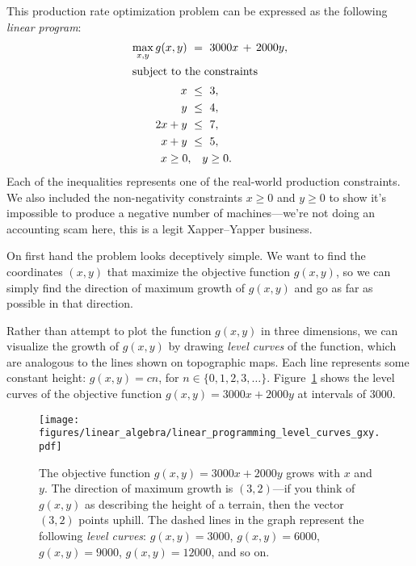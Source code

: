 \documentclass[11pt,oneside]{article}
\begin{document}
	This production rate optimization problem can be expressed as the following \emph{linear program}:
	\begin{align*}
		\max_{x,y} 	g(x,y) \ &=\  3000x  \, + \,  2000y, \\  %
	\intertext{subject to the constraints}
				x 		\ &\leq \		3,	\\
					y	\ &\leq \	 	4,	\\
				2x	+ y	\ &\leq \	 	7,	\\
				x 	+ y	\ &\leq \	 	5,	\\
				x \geq 0, 	& \quad  	y \geq 0.
	\end{align*}
	Each of the inequalities represents one of the real-world production constraints.
	We also included the non-negativity constraints $x \geq 0$ and $y \geq 0$ to show
	it's impossible to produce a negative number of machines---we're not doing an accounting scam here,
	this is a legit Xapper--Yapper business.
	
	
	On first hand the problem looks deceptively simple.
	We want to find the coordinates $(x,y)$ that maximize the objective function $g(x,y)$,
	so we can simply find the direction of maximum growth of $g(x,y)$ and go as far as 
	possible in that direction.
	
	Rather than attempt to plot the function $g(x,y)$ in three dimensions,
	we can visualize the growth of $g(x,y)$ by drawing \emph{level curves} of the function,
	which are analogous to the lines shown on topographic maps.
	Each line represents some constant height: $g(x,y)=cn$, for $n \in \{0,1,2,3, \ldots \}$.
	Figure~\ref{fig:linear_programming_level_curves_gxy} shows the level curves
	of the objective function $g(x,y)=3000x +  2000y$ at intervals of $3000$.
				
		\begin{figure}[htb]
		\begin{center}
		\texttt{[image: figures/linear\_algebra/linear\_programming\_level\_curves\_gxy.pdf]}
		\end{center}
		\vspace{-6mm}
		\caption{The objective function $g(x,y)=3000x +  2000y$ grows with $x$ and $y$. 
				The direction of maximum growth is $(3,2)$---if you think of $g(x,y)$ 
				as describing the height of a terrain, 
				then the vector $(3,2)$ points uphill.
				The dashed lines in the graph represent the following \emph{level curves}:
				$g(x,y)=3000$, $g(x,y)=6000$, $g(x,y)=9000$, $g(x,y)=12000$, and so on.}	%
		\label{fig:linear_programming_level_curves_gxy}
		\end{figure}
\end{document}
